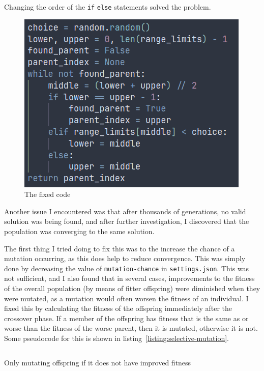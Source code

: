 \documentclass[a4paper, 12pt]{report}
\begin{document}
Changing the order of the \verb|if| \verb|else| statements solved the problem.
\begin{figure}[ht]
	\centering
	\includegraphics[scale=0.4]{images/binary-search-5}
	\caption{The fixed code}
	\label{fig:code-3}
\end{figure}

\newpage

Another issue I encountered was that after thousands of generations, no valid 
solution was being found, and after further investigation, I discovered that the
population was converging to the same solution.

The first thing I tried doing to fix this was to the increase the chance of a
mutation occurring, as this does help to reduce convergence. 
This was simply done by decreasing the value of \verb|mutation-chance| in 
\verb|settings.json|.
This was not sufficient, and I also found that in several cases, improvements to
the fitness of the overall population (by means of fitter offspring) were 
diminished when they were mutated, as a mutation would often worsen the fitness 
of an individual.
I fixed this by calculating the fitness of the offspring immediately after the 
crossover phase.
If a member of the offspring has fitness that is the same as or worse than the
fitness of the worse parent, then it is mutated, otherwise it is not.
Some pseudocode for this is shown in listing~\ref*{listing:selective-mutation}.

\begin{listing}[!ht]
	\inputminted[linenos, fontsize=\footnotesize]{text}{code/selective-mutation.txt}
	\caption{Only mutating offspring if it does not have improved fitness}
	\label{listing:selective-mutation}
\end{listing}
\end{document}
